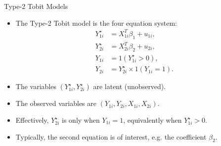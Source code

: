 \documentclass[xcolor=svgnames,dvipdfmx,cjk]{beamer}
\theoremstyle{example}
\begin{document}
\begin{frame}{Type-2 Tobit Models}
      \begin{itemize}
            \item The Type-2 Tobit model is the four equation system:
                  \begin{align*}
                        Y_{1i}^{\star} &= X_{1i}^T \beta_1 + u_{1i},\\
                        Y_{2i}^{\star} &= X_{2i}^T \beta_2 + u_{2i},\\
                        Y_{1i}         &= 1(Y_{1i}^{\star} > 0),\\
                        Y_{2i}         &= Y_{2i}^{\star} \times 1(Y_{1i} = 1).
                  \end{align*}
            \item The variables $(Y_{1i}^{\star}, Y_{2i}^{\star})$ are latent (unobserved).
            \item The observed variables are $( Y_{1i}, Y_{2i}, X_{1i}, X_{2i})$.
            \item Effectively, $Y_{2i}^{\star}$ is only when $Y_{1i} = 1$, equivalently when $Y_{1i}^{\star} > 0$.
            \item Typically, the second equation is of interest, e.g. the coefficient $\beta_2$. 
      \end{itemize}
\end{frame}
\end{document}
